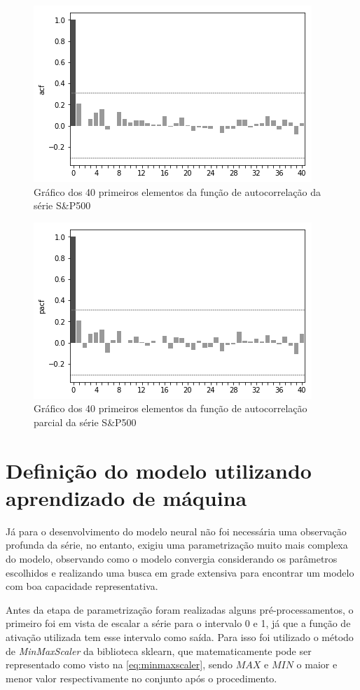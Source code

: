 \documentclass[
    12pt,
    oneside,
    a4paper,
    english,
    brazil
]{abntex2}
\begin{document}
\begin{figure}[ht]
    \centering
    \caption{Gráfico dos 40 primeiros elementos da função de autocorrelação da
    série S\&P500}\label{fig:sp500acf}
    \includegraphics[width=.5\linewidth]{images/sp500acf.png}
\end{figure}

\begin{figure}[ht]
    \centering
    \caption{Gráfico  dos 40  primeiros elementos  da função  de autocorrelação
    parcial da série S\&P500}\label{fig:sp500pacf}
    \includegraphics[width=.5\linewidth]{images/sp500pacf.png}
\end{figure}

\section{Definição do modelo utilizando aprendizado de máquina}

Já para  o desenvolvimento do modelo  neural não foi necessária  uma observação
profunda da  série, no entanto,  exigiu uma parametrização muito  mais complexa
do  modelo,  observando como  o  modelo  convergia considerando  os  parâmetros
escolhidos e realizando  uma busca em grade extensiva para  encontrar um modelo
com boa capacidade representativa.

Antes da etapa de parametrização  foram realizadas alguns pré-processamentos, o
primeiro foi  em vista  de escalar a  série para o  intervalo 0  e 1, já  que a
função  de  ativação  utilizada  tem  esse  intervalo  como  saída.  Para  isso
foi  utilizado o  método de  \textit{MinMaxScaler} da  biblioteca sklearn,  que
matematicamente pode ser representado  como visto na \autoref{eq:minmaxscaler},
sendo $MAX$ e  $MIN$ o maior e  menor valor respectivamente no  conjunto após o
procedimento.
\end{document}

